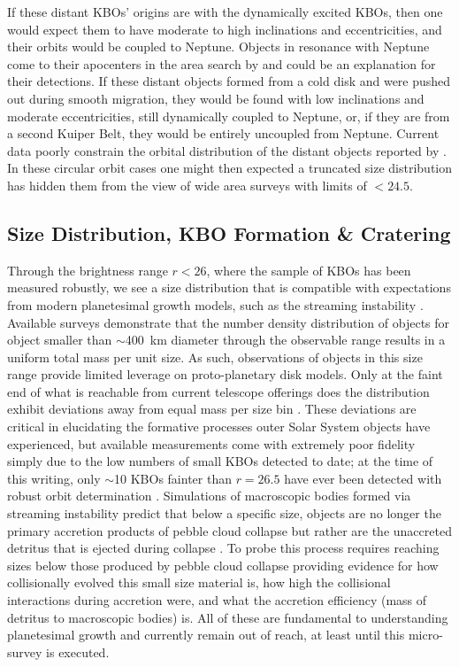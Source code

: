 \documentclass[modern,linenumbers,trackchanges,preprint]{aastex631}
\begin{document}
If these distant KBOs' origins are with the dynamically excited KBOs, then one would expect them to have moderate to high inclinations and eccentricities, and their orbits would be coupled to Neptune. 
Objects in resonance with Neptune come to their apocenters in the area search by \citet{Fraser2024PSJ} and could be an explanation for their detections. 
If these distant objects formed from a cold disk and were pushed out during smooth migration, they would be found with low inclinations and moderate eccentricities, still dynamically coupled to Neptune, or, if they are from a second Kuiper Belt, they would be entirely uncoupled from Neptune. Current data poorly constrain the orbital distribution of the distant objects reported by \citet{Fraser2024PSJ}.  
In these circular orbit cases one might then expected a truncated size distribution has hidden them from the view of wide area surveys with limits of $<24.5$.

\subsection{Size Distribution, KBO Formation \& Cratering} 
Through the brightness range $r<26$, where the sample of KBOs has been measured robustly, we see a size distribution that is compatible with expectations from modern planetesimal growth models, such as the streaming instability \citep{Kavelaars2021, Petit2023, Napier2023}. 
Available surveys demonstrate that the number density distribution of objects for object smaller than $\sim$400~km diameter through the observable range results in a uniform total mass per unit size. 
As such, observations of objects in this size range provide limited leverage on proto-planetary disk models. 
Only at the faint end of what is reachable from current telescope offerings does the distribution exhibit deviations away from equal mass per size bin \citep{Napier2023}. 
These deviations are critical in elucidating the formative processes outer Solar System objects have experienced, but available measurements come with extremely poor fidelity simply due to the low numbers of small KBOs detected to date; at the time of this writing, only $\sim$10 KBOs fainter than $r=26.5$ have ever been detected with robust orbit determination \citep{Bernstein2004, Smotherman2024}. 
Simulations of macroscopic bodies formed via streaming instability predict that below a specific size, objects are no longer the primary accretion products of pebble cloud collapse but rather are the unaccreted detritus that is ejected during collapse \citep[e.g.,][]{Robinson2020, Polak2023}. 
To probe this process requires reaching sizes below those produced by pebble cloud collapse providing evidence for how collisionally evolved this small size material is, how high the collisional interactions during accretion were, and what the accretion efficiency (mass of detritus to macroscopic bodies) is. 
All of these are fundamental to understanding planetesimal growth and currently remain out of reach, at least until this micro-survey is executed.
\end{document}
